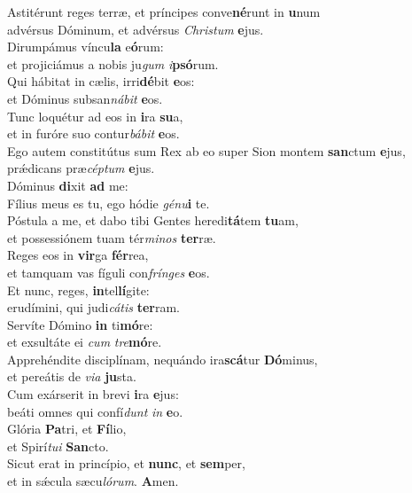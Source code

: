 \evenverse Astitérunt reges terræ, et príncipes conve\textbf{né}runt in \textbf{u}num~\*\\
\evenverse advérsus Dóminum, et advérsus \textit{Chri}\textit{stum} \textbf{e}jus.\\
\oddverse Dirumpámus víncu\textbf{la} e\textbf{ó}rum:~\*\\
\oddverse et projiciámus a nobis ju\textit{gum} \textit{i}\textbf{psó}rum.\\
\evenverse Qui hábitat in cælis, irri\textbf{dé}bit \textbf{e}os:~\*\\
\evenverse et Dóminus subsan\textit{ná}\textit{bit} \textbf{e}os.\\
\oddverse Tunc loquétur ad eos in \textbf{i}ra \textbf{su}a,~\*\\
\oddverse et in furóre suo contur\textit{bá}\textit{bit} \textbf{e}os.\\
\evenverse Ego autem constitútus sum Rex ab eo super Sion montem \textbf{san}ctum \textbf{e}jus,~\*\\
\evenverse prǽdicans præ\textit{cép}\textit{tum} \textbf{e}jus.\\
\oddverse Dóminus \textbf{di}xit \textbf{ad} me:~\*\\
\oddverse Fílius meus es tu, ego hódie \textit{gé}\textit{nu}\textbf{i} te.\\
\evenverse Póstula a me, et dabo tibi Gentes heredi\textbf{tá}tem \textbf{tu}am,~\*\\
\evenverse et possessiónem tuam tér\textit{mi}\textit{nos} \textbf{ter}ræ.\\
\oddverse Reges eos in \textbf{vir}ga \textbf{fér}rea,~\*\\
\oddverse et tamquam vas fíguli con\textit{frín}\textit{ges} \textbf{e}os.\\
\evenverse Et nunc, reges, \textbf{in}tel\textbf{lí}gite:~\*\\
\evenverse erudímini, qui judi\textit{cá}\textit{tis} \textbf{ter}ram.\\
\oddverse Servíte Dómino \textbf{in} ti\textbf{mó}re:~\*\\
\oddverse et exsultáte ei \textit{cum} \textit{tre}\textbf{mó}re.\\
\evenverse Apprehéndite disciplínam, nequándo ira\textbf{scá}tur \textbf{Dó}minus,~\*\\
\evenverse et pereátis de \textit{vi}\textit{a} \textbf{ju}sta.\\
\oddverse Cum exárserit in brevi \textbf{i}ra \textbf{e}jus:~\*\\
\oddverse beáti omnes qui confí\textit{dunt} \textit{in} \textbf{e}o.\\
\evenverse Glória \textbf{Pa}tri, et \textbf{Fí}lio,~\*\\
\evenverse et Spirí\textit{tu}\textit{i} \textbf{San}cto.\\
\oddverse Sicut erat in princípio, et \textbf{nunc}, et \textbf{sem}per,~\*\\
\oddverse et in sǽcula sæcu\textit{ló}\textit{rum}. \textbf{A}men.\\
